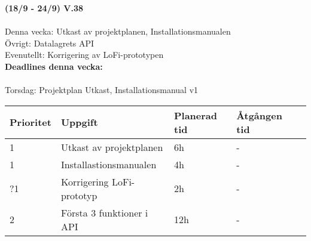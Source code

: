\documentclass{TDP003mall}
\begin{document}
  \hrulefill

\textbf{(18/9 - 24/9) V.38}\\\\
  Denna vecka: Utkast av projektplanen, Installationsmanualen\\
  Övrigt: Datalagrets API\\
  Evenutellt: Korrigering av LoFi-prototypen\\

  \textbf{Deadlines denna vecka: }\\\\
  Torsdag: Projektplan Utkast, Installationsmanual v1


\begin{table}[]
  \begin{tabular}{|l|l|l|l|l|}
  \hline
   Prioritet & Uppgift                    & Planerad tid & Åtgången tid \\ \hline
   1         & Utkast av projektplanen  & 6h          & -          \\ \hline
   1         & Installastionsmanualen  & 4h           & -       \\ \hline
   ?1        & Korrigering LoFi-prototyp &2h          & -       \\ \hline
   2         & Första 3 funktioner i API & 12h           & -           \\ \hline
  \end{tabular}
  \end{table}

  \hrulefill
\end{document}
